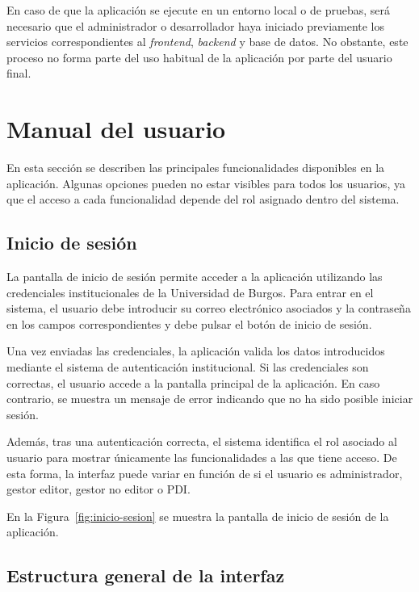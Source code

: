 En caso de que la aplicación se ejecute en un entorno local o de pruebas, será necesario que el administrador o desarrollador haya iniciado previamente los servicios correspondientes al \textit{frontend}, \textit{backend} y base de datos. No obstante, este proceso no forma parte del uso habitual de la aplicación por parte del usuario final.

\section{Manual del usuario}

En esta sección se describen las principales funcionalidades disponibles en la aplicación. Algunas opciones pueden no estar visibles para todos los usuarios, ya que el acceso a cada funcionalidad depende del rol asignado dentro del sistema.

\subsection{Inicio de sesión}

La pantalla de inicio de sesión permite acceder a la aplicación utilizando las credenciales institucionales de la Universidad de Burgos. Para entrar en el sistema, el usuario debe introducir su correo electrónico asociados y la contraseña en los campos correspondientes y debe pulsar el botón de inicio de sesión.

Una vez enviadas las credenciales, la aplicación valida los datos introducidos mediante el sistema de autenticación institucional. Si las credenciales son correctas, el usuario accede a la pantalla principal de la aplicación. En caso contrario, se muestra un mensaje de error indicando que no ha sido posible iniciar sesión.

Además, tras una autenticación correcta, el sistema identifica el rol asociado al usuario para mostrar únicamente las funcionalidades a las que tiene acceso. De esta forma, la interfaz puede variar en función de si el usuario es administrador, gestor editor, gestor no editor o PDI.

En la Figura~\ref{fig:inicio-sesion} se muestra la pantalla de inicio de sesión de la aplicación.


\subsection{Estructura general de la interfaz}


